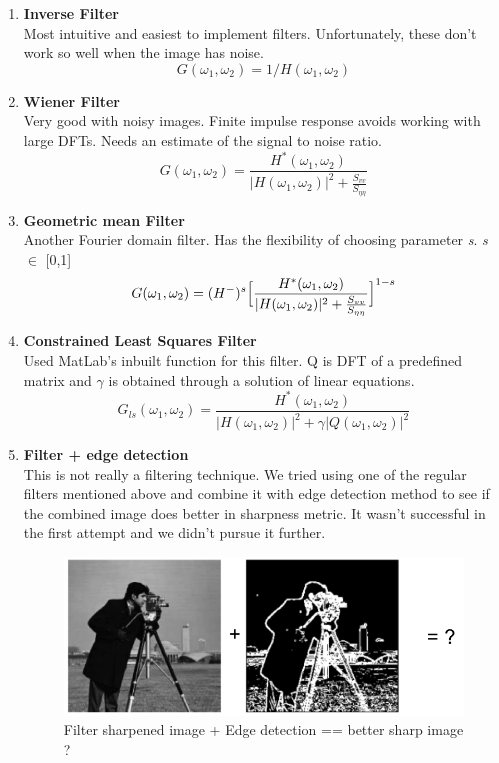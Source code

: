 \begin{enumerate}
\item {\bf Inverse Filter}\\
Most intuitive and easiest to implement filters. Unfortunately, these don't work so well when the image has noise.
\begin{equation}
G(\omega_1,\omega_2) = 1/H(\omega_1,\omega_2)
\end{equation}

\item {\bf Wiener Filter}\\
Very good with noisy images. Finite impulse response avoids working with large DFTs. Needs an estimate of the signal to noise ratio.
\begin{equation}
G(\omega_1,\omega_2) = \frac{H^*(\omega_1,\omega_2)}{|H(\omega_1,\omega_2)|^2 + \frac{S_{vv}}{S_{\eta\eta}}}
\end{equation}

\item {\bf Geometric mean Filter}\\
Another Fourier domain filter. Has the flexibility of choosing parameter {\sl s}. {\sl s} $\in$ [0,1]
\begin{equation}
G(\omega_1,\omega_2) = (H^-)^s\Bigl[\frac{H^*(\omega_1,\omega_2)}{|H(\omega_1,\omega_2)|^2 + \frac{S_{vv}}{S_{\eta\eta}}}\Bigr]^{1-s}
\end{equation}

\item {\bf Constrained Least Squares Filter}\\
Used MatLab's inbuilt function for this filter. Q is DFT of a predefined matrix and $\gamma$ is obtained through a solution of linear equations.
\begin{equation}
G_{ls}(\omega_1,\omega_2) = \frac{H^*(\omega_1,\omega_2)}{|H(\omega_1,\omega_2)|^2 + \gamma|Q(\omega_1,\omega_2)|^2}
\end{equation}

\item {\bf Filter + edge detection}\\
This is not really a filtering technique. We tried using one of the regular filters mentioned above and combine it with edge detection method to see if the combined image does better in sharpness metric. It wasn't successful in the first attempt and we didn't pursue it further. 
\begin{figure}[H]
\centering
\includegraphics[scale=1]{ED}
\caption{Filter sharpened image + Edge detection == better sharp image ?}
\end{figure}

\end{enumerate}
\newpage